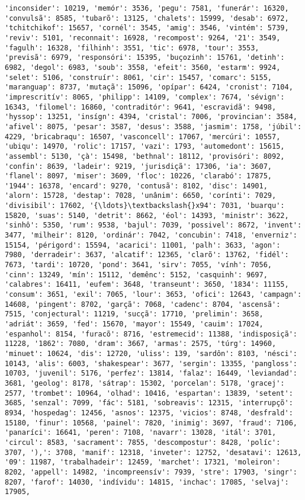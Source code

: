 \begin{Verbatim}[commandchars=\\\{\}]
'inconsider': 10219, 'memór': 3536, 'pegu': 7581, 'funerár': 16320, 'convulsã': 8585, 'tubarõ': 13125, 'chalets': 15999, 'desab': 6972, 'tchitchikof': 15657, 'cornél': 3545, 'amig': 3546, 'vintém': 5739, 'reviv': 5101, 'reconnait': 16928, 'recompost': 9264, '21': 3549, 'fagulh': 16328, 'filhinh': 3551, 'tic': 6978, 'tour': 3553, 'previsã': 6979, 'responsóri': 15395, 'buçozinh': 15761, 'detinh': 6982, 'degol': 6983, 'soub': 3558, 'efeit': 3560, 'estarm': 9924, 'selet': 5106, 'construír': 8061, 'cir': 15457, 'comarc': 5155, 'maranguap': 8737, 'mutaçã': 15096, 'opípar': 6424, 'cronist': 7104, 'imprescritív': 8065, 'philipp': 14109, 'complex': 7674, 'sévign': 16343, 'filomel': 16860, 'contraditór': 9641, 'escravidã': 9498, 'hyssop': 13251, 'insígn': 4394, 'cristal': 7006, 'provincian': 3584, 'afivel': 8075, 'pesar': 3587, 'desus': 3588, 'jasmim': 1758, 'júbil': 4229, 'bricabraqu': 16507, 'vasconcell': 17067, 'mercúri': 10557, 'ubiqu': 14970, 'rolic': 17157, 'vazi': 1793, 'automedont': 15615, 'assembl': 5130, 'çà': 15498, 'bethnal': 18112, 'provisóri': 8092, 'confin': 8639, 'ladeir': 9219, 'jurisdiçã': 17306, 'ia': 3607, 'flanel': 8097, 'miser': 3609, 'floc': 10226, 'clarabó': 17875, '1944': 16378, 'encard': 9270, 'contusã': 8102, 'disc': 14901, 'alorn': 15728, 'destap': 7028, 'unânim': 6650, 'corínti': 7029, 'divisibil': 17602, '{\ldots}\textbackslash{}x94': 7031, 'buarqu': 15820, 'suas': 5140, 'detrit': 8662, 'éol': 14393, 'ministr': 3622, 'sinhô': 5350, 'rum': 9538, 'bajul': 7039, 'possivel': 8672, 'invent': 3477, 'milheir': 8120, 'ordinár': 7042, 'concubin': 7418, 'enverniz': 15154, 'périgord': 15594, 'acarici': 11001, 'palh': 3633, 'agon': 7980, 'derradeir': 3637, 'alcatif': 12365, 'clarõ': 13762, 'fidél': 7673, 'tardi': 10720, 'pond': 3641, 'sirv': 7055, 'vính': 7056, 'cinn': 13249, 'mín': 15112, 'demênc': 5152, 'casquinh': 9697, 'calabres': 16411, 'eufem': 3648, 'transeunt': 3650, '1834': 11155, 'consum': 3651, 'exil': 7065, 'lour': 3653, 'ofici': 12643, 'campagn': 14608, 'pingent': 8702, 'garçã': 7068, 'cadenc': 8704, 'ascensã': 7515, 'conjectural': 11219, 'sucçã': 17710, 'prelimin': 3658, 'adriát': 3659, 'fed': 15670, 'mayor': 15549, 'cauim': 17024, 'espanhol': 8154, 'furacõ': 8716, 'estremecid': 11388, 'indisposiçã': 11228, '1862': 7080, 'dram': 3667, 'armas': 2575, 'túrg': 14960, 'minuet': 10624, 'dis': 12720, 'uliss': 139, 'sardôn': 8103, 'nésci': 10143, 'alis': 6003, 'shakespear': 3677, 'sergin': 13355, 'pangloss': 10703, 'juvenil': 5176, 'perfez': 13814, 'falaz': 16449, 'leviandad': 3681, 'geolog': 8178, 'sátrap': 15302, 'porcelan': 5178, 'gracej': 2577, 'trombet': 10964, 'olhad': 10416, 'espartan': 13839, 'setent': 3685, 'senzal': 7099, 'fác': 5181, 'sobreavis': 12315, 'interrupçõ': 8934, 'hospedag': 12456, 'asnos': 12375, 'vicios': 8748, 'desfrald': 15180, 'finur': 10568, 'painel': 7820, 'inimig': 3697, 'fraud': 7106, 'panaríci': 16641, 'peren': 7108, 'navarr': 13028, 'itál': 3701, 'circul': 8583, 'sacrament': 7855, 'descompostur': 8428, 'políc': 3707, '),': 3708, 'manif': 12318, 'inveter': 12752, 'desatavi': 12613, '09': 11987, 'trabalhadeir': 12459, 'marchet': 17321, 'moleiron': 8202, 'appell': 14982, 'incompreensív': 7939, 'stre': 17903, 'singr': 8207, 'farof': 14030, 'indívidu': 14815, 'inchac': 17085, 'selvaj': 17905, 
\end{Verbatim}
